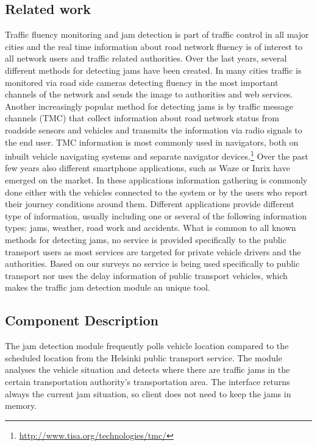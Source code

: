 \subsection{Related work}

Traffic fluency monitoring and jam detection is part of traffic
control in all major cities and the real time information about road
network fluency is of interest to all network users and traffic
related authorities. Over the last years, several different methods
for detecting jams have been created. In many cities traffic is
monitored via road side cameras detecting fluency in the most
important channels of the network and sends the image to authorities
and web services. Another increasingly popular method for detecting
jams is by traffic message channels (TMC) that collect information
about road network status from roadside sensors and vehicles and
transmits the information via radio signals to the end user. TMC
information is most commonly used in navigators, both on inbuilt
vehicle navigating systems and separate navigator
devices.\footnote{\url{http://www.tisa.org/technologies/tmc/}} Over
the past few years also different smartphone applications, such as
Waze or Inrix have emerged on the market. In these applications
information gathering is commonly done either with the vehicles
connected to the system or by the users who report their journey
conditions around them. Different applications provide different type
of information, usually including one or several of the following
information types: jams, weather, road work and accidents.  What is
common to all known methods for detecting jams, no service is provided
specifically to the public transport users as most services are
targeted for private vehicle drivers and the authorities. Based on our
surveys no service is being used specifically to public transport nor
uses the delay information of public transport vehicles, which makes
the traffic jam detection module an unique tool.

\subsection{Component Description}

The jam detection module frequently polls vehicle location compared to
the scheduled location from the Helsinki public transport service. The
module analyses the vehicle situation and detects where there are
traffic jams in the certain transportation authority’s transportation
area. The interface returns always the current jam situation, so
client does not need to keep the jams in memory.

